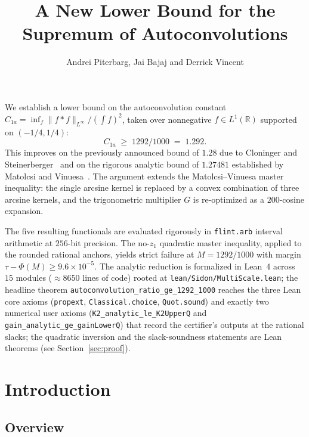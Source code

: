 \documentclass[11pt, letterpaper]{article}
\title{\texorpdfstring{%
  A New Lower Bound for the\\
  Supremum of Autoconvolutions
}{A New Lower Bound for the Supremum of Autoconvolutions}}
\author{Andrei Piterbarg, Jai Bajaj and Derrick Vincent}
\date{}
\renewenvironment{abstract}{%
  \vspace{2.6ex plus 0.8ex minus 0.3ex}%
  \begin{center}{\normalfont\Large\bfseries\abstractname}\end{center}%
  \vspace{1.4ex}%
  \small\quotation
}{%
  \endquotation
}
\theoremstyle{paperplain}
\theoremstyle{paperdef}
\newcommand{\R}{\mathbb{R}}
\newcommand{\Linf}{L^\infty}
\begin{document}
\maketitle

\begin{abstract}
We establish a lower bound on the
autoconvolution constant
$C_{1a}=\inf_f \|f*f\|_{\Linf}/(\int f)^2$, taken over nonnegative
$f\in L^1(\R)$ supported on $(-1/4,1/4)$:
\[
  C_{1a}\;\ge\;1292/1000\;=\;1.292.
\]
This improves on the previously announced bound of
$1.28$ due to Cloninger and Steinerberger~\cite{CS17} and on the
rigorous analytic bound of $1.27481$ established by Matolcsi and
Vinuesa~\cite{MV10}.  The argument extends the Matolcsi--Vinuesa
master inequality: the single arcsine kernel is
replaced by a convex combination of three arcsine kernels, and the
trigonometric multiplier $G$ is re-optimized as a $200$-cosine
expansion.
\par\medskip
The five resulting functionals are evaluated rigorously in
\texttt{flint.arb} interval arithmetic at $256$-bit precision.  The
no-$z_1$ quadratic master inequality, applied to the rounded rational
anchors, yields strict failure at $M=1292/1000$ with margin
$\tau-\Phi(M)\ge 9.6\times 10^{-5}$.  The analytic reduction is
formalized in Lean~4 across $15$ modules ($\approx 8650$ lines of
code) rooted at \texttt{lean/Sidon/MultiScale.lean}; the headline
theorem \texttt{autoconvolution\_ratio\_ge\_1292\_1000} reaches the
three Lean core axioms (\texttt{propext}, \texttt{Classical.choice},
\texttt{Quot.sound}) and exactly two numerical user axioms
(\texttt{K2\_analytic\_le\_K2UpperQ} and
\texttt{gain\_analytic\_ge\_gainLowerQ}) that record the certifier's
outputs at the rational slacks; the quadratic inversion and the
slack-soundness statements are Lean theorems (see
Section~\ref{sec:proof}).
\end{abstract}

\section{Introduction}\label{sec:intro}

\subsection{Overview}\label{subsec:intro-overview}
\end{document}
